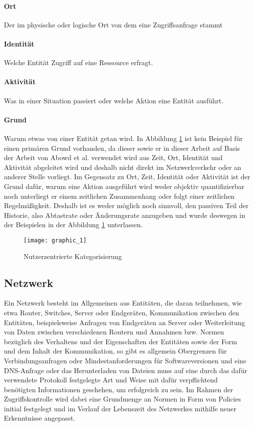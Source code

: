 \paragraph{Ort}
Der im physische oder logische Ort von dem eine Zugriffsanfrage stammt
\paragraph{Identität}
Welche Entität Zugriff auf eine Ressource erfragt.
\paragraph{Aktivität}
Was in einer Situation passiert oder welche Aktion eine Entität ausführt.
\paragraph{Grund}
Warum etwas von einer Entität getan wird. In Abbildung \ref{Tax_1} ist kein Beispiel für einen primären Grund vorhanden, da dieser sowie er in dieser Arbeit auf Basis der Arbeit von Abowd et al. \cite{abowd_towards_1999} verwendet wird aus Zeit, Ort, Identität und Aktivität abgeleitet wird und deshalb nicht direkt im Netzwerkverkehr oder an anderer Stelle vorliegt. Im Gegensatz zu Ort, Zeit, Identität oder Aktivität ist der Grund dafür, warum eine Aktion ausgeführt wird weder objektiv quantifizierbar noch unterliegt er einem zeitlichen Zusammenhang oder folgt einer zeitlichen Regelmäßigkeit. Deshalb ist es weder möglich noch sinnvoll, den passiven Teil der Historie, also Abtastrate oder Änderungsrate anzugeben und wurde deswegen in der Beispielen in der Abbildung \ref{Tax_1} unterlassen.
\begin{figure}[H]
\label{Tax_1}
\centering
\texttt{[image: graphic\_1]}
\caption{Nutzerzentrierte Kategorisierung}
\end{figure}
\subsection{Netzwerk}
Ein Netzwerk besteht im Allgemeinen aus Entitäten, die daran teilnehmen, wie etwa Router, Switches, Server oder Endgeräten, Kommunikation zwischen den Entitäten, beispielsweise Anfragen von Endgeräten an Server oder Weiterleitung von Daten zwischen verschiedenen Routern und Annahmen bzw. Normen bezüglich des Verhaltens und der Eigenschaften der Entitäten sowie der Form und dem Inhalt der Kommunikation, so gibt es allgemein Obergrenzen für Verbindungsanfragen oder Mindestanforderungen für Softwareversionen und eine DNS-Anfrage oder das Herunterladen von Dateien muss auf eine durch das dafür verwendete Protokoll festgelegte Art und Weise mit dafür verpflichtend benötigten Informationen geschehen, um erfolgreich zu sein.
Im Rahmen der Zugriffskontrolle wird dabei eine Grundmenge an Normen in Form von Policies initial festgelegt und im Verlauf der Lebenszeit des Netzwerkes mithilfe neuer Erkenntnisse angepasst.
